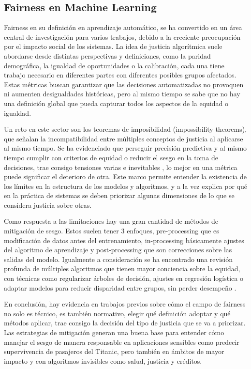 \documentclass[conference]{IEEEtran}
\begin{document}
\subsection{Fairness en Machine Learning}

Fairness en su definición en aprendizaje automático, se ha convertido en un área central de investigación para varios trabajos, debido a la creciente preocupación por el impacto social de los sistemas. La idea de justicia algorítmica suele abordarse desde distintas perspectivas y definiciones, como la paridad demográfica, la igualdad de oportunidades o la calibración, cada una tiene trabajo necesario en diferentes partes con diferentes posibles grupos afectados. Estas métricas buscan garantizar que las decisiones automatizadas no provoquen ni aumenten desigualdades históricas, pero al mismo tiempo se sabe que no hay una definición global que pueda capturar todos los aspectos de la equidad o igualdad.

Un reto en este sector son los teoremas de imposibilidad (impossibility theorems), que señalan la incompatibilidad entre múltiples conceptos de justicia al aplicarse al mismo tiempo. Se ha evidenciado que perseguir precisión predictiva y al mismo tiempo cumplir con criterios de equidad o reducir el sesgo en la toma de decisiones, trae consigo tensiones varias e inevitables \cite{plecko2024}, lo mejor en una métrica puede significar el deterioro de otra. Este marco permite entender la existencia de los límites en la estructura de los modelos y algoritmos, y a la vez explica por qué en la práctica de sistemas se deben priorizar algunas dimensiones de lo que se considera justicia sobre otras.

Como respuesta a las limitaciones hay una gran cantidad de métodos de mitigación de sesgo. Estos suelen tener 3 enfoques, pre-processing que es modificación de datos antes del entrenamiento, in-processing básicamente ajustes del algoritmo de aprendizaje y post-processing que son correcciones sobre las salidas del modelo. Igualmente a consideración se ha encontrado una revisión profunda de múltiples algoritmos que tienen mayor conciencia sobre la equidad, con técnicas como regularizar árboles de decisión, ajustes en regresión logística o adaptar modelos para reducir disparidad entre grupos, sin perder desempeño \cite{raftopoulos2025}.

En conclusión, hay evidencia en trabajos previos sobre cómo el campo de fairness no solo es técnico, es también normativo, elegir qué definición adoptar y qué métodos aplicar, trae consigo la decisión del tipo de justicia que se va a priorizar. Las estrategias de mitigación generan una buena base para entender cómo manejar el sesgo de manera responsable en aplicaciones sensibles como predecir supervivencia de pasajeros del Titanic, pero también en ámbitos de mayor impacto y con algoritmos invisibles como salud, justicia y créditos.
\end{document}
